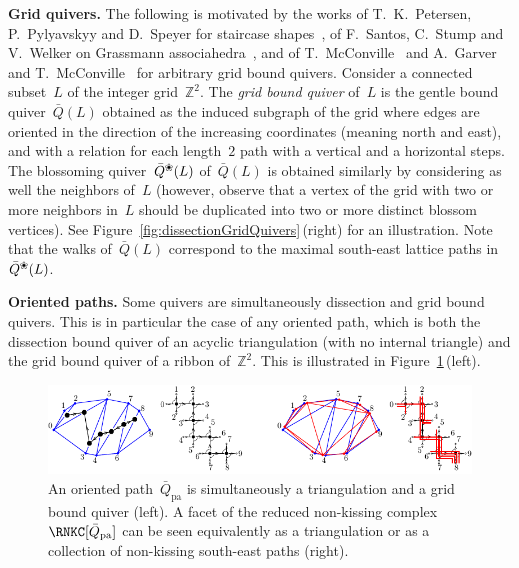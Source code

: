 \documentclass{amsart}
\theoremstyle{definition}
\newcommand{\Z}{\mathbb{Z}} %
\newcommand{\fref}[1]{Figure~\ref{#1}} %
\newcommand{\darkblue}{\color{darkblue}} %
\newcommand{\defn}[1]{\textsl{\darkblue #1}} %
\newcommand{\para}[1]{\medskip\noindent\textbf{#1.}} %
\newcommand{\pa}{_{\textrm{pa}}} %
\newcommand{\blossom}{^\text{\ding{96}}} %
\begin{document}
\para{Grid quivers}
The following is motivated by the works of T.~K.~Petersen, P.~Pylyavskyy and D.~Speyer for staircase shapes~\cite{PetersenPylyavskyySpeyer}, of F.~Santos, C.~Stump and V.~Welker on Grassmann associahedra~\cite{SantosStumpWelker}, and of T.~McConville~\cite{McConville} and A.~Garver and T.~McConville~\cite{GarverMcConville-grid} for arbitrary grid bound quivers.
Consider a connected subset~$L$ of the integer grid~$\Z^2$.
The \defn{grid bound quiver} of~$L$ is the gentle bound quiver~$\bar Q(L)$ obtained as the induced subgraph of the grid where edges are oriented in the direction of the increasing coordinates (meaning north and east), and with a relation for each length~$2$ path with a vertical and a horizontal steps.
The blossoming quiver~$\bar Q\blossom(L)$ of~$\bar Q(L)$ is obtained similarly by considering as well the neighbors of~$L$ (however, observe that a vertex of the grid with two or more neighbors in~$L$ should be duplicated into two or more distinct blossom vertices).
See \fref{fig:dissectionGridQuivers}\,(right) for an illustration.
Note that the walks of~$\bar Q(L)$ correspond to the maximal south-east lattice paths in~$\bar Q\blossom(L)$.

\para{Oriented paths}
Some quivers are simultaneously dissection and grid bound quivers. This is in particular the case of any oriented path, which is both the dissection bound quiver of an acyclic triangulation (with no internal triangle) and the grid bound quiver of a ribbon of~$\Z^2$. This is illustrated in \fref{fig:exmBijectionAssociahedron}\,(left).

\begin{figure}[t]
	\capstart
	\centerline{\includegraphics[scale=1.4]{exmBijectionAssociahedron}}
	\caption{An oriented path~$\bar Q\pa$ is simultaneously a triangulation and a grid bound quiver (left). A facet of the reduced non-kissing complex~$\RNKC[\bar Q\pa]$ can be seen equivalently as a triangulation or as a collection of non-kissing south-east paths (right).}
	\label{fig:exmBijectionAssociahedron}
\end{figure}
\end{document}
